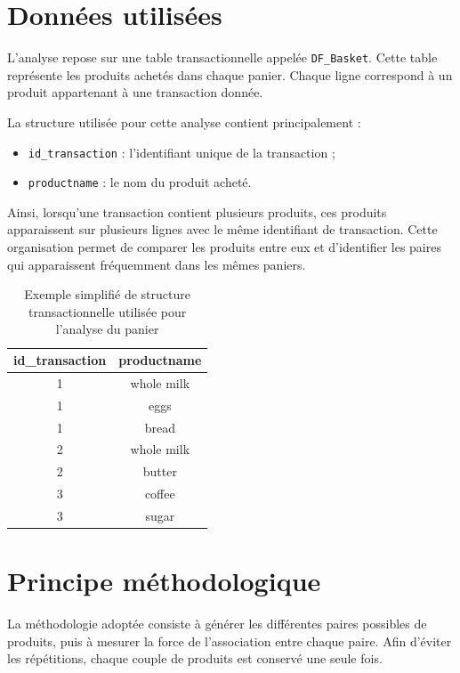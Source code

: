 \documentclass[12pt,a4paper,twoside]{report}
\begin{document}
\section{Données utilisées}

L'analyse repose sur une table transactionnelle appelée \texttt{DF\_Basket}. Cette table représente les produits achetés dans chaque panier. Chaque ligne correspond à un produit appartenant à une transaction donnée.

La structure utilisée pour cette analyse contient principalement :

\begin{itemize}
  \item \texttt{id\_transaction} : l'identifiant unique de la transaction ;
  \item \texttt{productname} : le nom du produit acheté.
\end{itemize}

Ainsi, lorsqu'une transaction contient plusieurs produits, ces produits apparaissent sur plusieurs lignes avec le même identifiant de transaction. Cette organisation permet de comparer les produits entre eux et d'identifier les paires qui apparaissent fréquemment dans les mêmes paniers.

\begin{table}[H]
\centering
{}
\begin{tabular}{cc}
\toprule
\rowcolor{TableHeader}
\color{white}\textbf{id\_transaction} & \color{white}\textbf{productname} \\
\midrule
1 & whole milk \\
1 & eggs \\
1 & bread \\
2 & whole milk \\
2 & butter \\
3 & coffee \\
3 & sugar \\
\bottomrule
\end{tabular}
\caption{Exemple simplifié de structure transactionnelle utilisée pour l'analyse du panier}
\label{tab:structure-basket}
\end{table}

\section{Principe méthodologique}

La méthodologie adoptée consiste à générer les différentes paires possibles de produits, puis à mesurer la force de l'association entre chaque paire. Afin d'éviter les répétitions, chaque couple de produits est conservé une seule fois.
\end{document}
